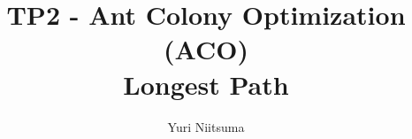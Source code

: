 \documentclass[journal]{IEEEtran}
\begin{document}
  \title{TP2 - Ant Colony Optimization (ACO)\\
  Longest Path} 
  \author{Yuri Niitsuma}

\maketitle

% 


% 
% 
\end{document}
